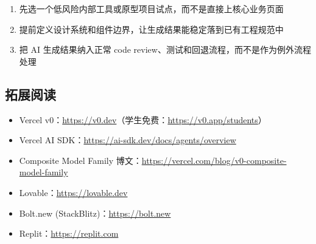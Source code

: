\begin{enumerate}
    \item 先选一个低风险内部工具或原型项目试点，而不是直接上核心业务页面
    \item 提前定义设计系统和组件边界，让生成结果能稳定落到已有工程规范中
    \item 把 AI 生成结果纳入正常 code review、测试和回退流程，而不是作为例外流程处理
\end{enumerate}

\subsection{拓展阅读}

\begin{itemize}
    \item Vercel v0：\url{https://v0.dev}（学生免费：\url{https://v0.app/students}）
    \item Vercel AI SDK：\url{https://ai-sdk.dev/docs/agents/overview}
    \item Composite Model Family 博文：\url{https://vercel.com/blog/v0-composite-model-family}
    \item Lovable：\url{https://lovable.dev}
    \item Bolt.new (StackBlitz)：\url{https://bolt.new}
    \item Replit：\url{https://replit.com}
\end{itemize}



